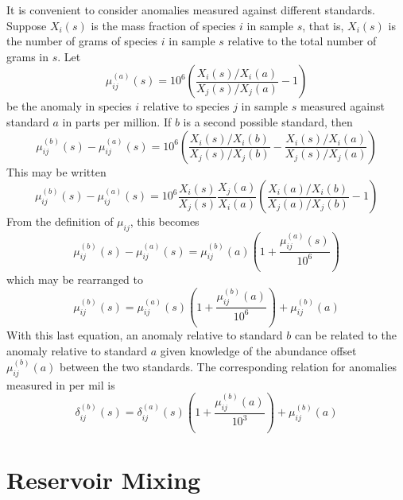\documentclass[preprint]{revtex4-2}
\begin{document}
It is convenient to consider anomalies measured  against different standards.
Suppose $X_i(s)$ is the mass fraction of species $i$ in sample $s$, that is,
$X_i(s)$ is the number of grams of species $i$ in sample $s$ relative to the
total number of grams in $s$.  Let
\begin{equation}
\mu_{ij}^{(a)}(s) = 10^6 \left(\frac{X_i(s)/X_i(a)}{X_j(s)/X_j(a)} - 1\right)
\label{eq:mu_ija}
\end{equation}
be the anomaly in species $i$ relative to species $j$ in sample $s$
measured against standard $a$ in parts per million.
If $b$ is a second possible standard, then
\begin{equation}
\mu_{ij}^{(b)}(s) - \mu_{ij}^{(a)}(s) =
10^6 \left(\frac{X_i(s)/X_i(b)}{X_j(s)/X_j(b)} -
\frac{X_i(s)/X_i(a)}{X_j(s)/X_j(a)}
\right)
\label{eq:diff_mu}
\end{equation}
This may be written
\begin{equation}
\mu_{ij}^{(b)}(s) - \mu_{ij}^{(a)}(s) =
10^6 \frac{X_i(s)}{X_j(s)}\frac{X_j(a)}{X_i(a)}
\left(\frac{X_i(a)/X_i(b)}{X_j(a)/X_j(b)} - 1\right)
\label{eq:diff_mu2}
\end{equation}
From the definition of $\mu_{ij}$, this becomes
\begin{equation}
\mu_{ij}^{(b)}(s) - \mu_{ij}^{(a)}(s) =
\mu_{ij}^{(b)}(a) \left(1 + \frac{\mu_{ij}^{(a)}(s)}{10^6}\right)
\label{eq:diff_mu3}
\end{equation}
which may be rearranged to
\begin{equation}
\mu_{ij}^{(b)}(s) =
\mu_{ij}^{(a)}(s) \left(1 + \frac{\mu_{ij}^{(b)}(a)}{10^6}\right)
+ \mu_{ij}^{(b)}(a)
\label{eq:diff_mu4}
\end{equation}
With this last equation, an anomaly relative to standard $b$ can be
related to the anomaly relative to standard $a$ given knowledge of the
abundance offset $\mu_{ij}^{(b)}(a)$ between the two standards.
The corresponding relation for anomalies measured in per mil is
\begin{equation}
\delta_{ij}^{(b)}(s) =
\delta_{ij}^{(a)}(s) \left(1 + \frac{\mu_{ij}^{(b)}(a)}{10^3}\right)
+ \mu_{ij}^{(b)}(a)
\label{eq:diff_delta}
\end{equation}

\section{Reservoir Mixing}
\end{document}
